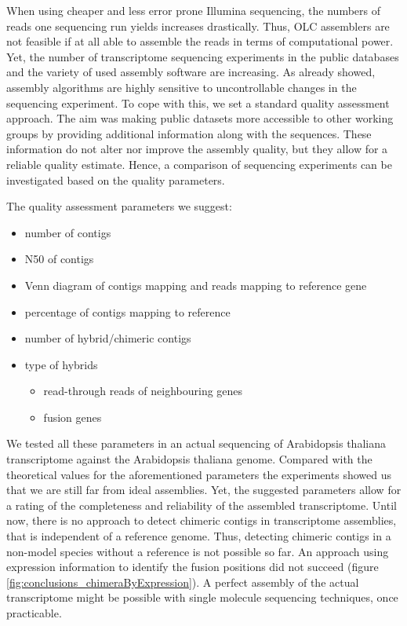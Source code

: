 	
	When using cheaper and less error prone Illumina sequencing, the numbers of reads one sequencing run yields increases drastically.
	Thus, \ac{OLC} assemblers are not feasible if at all able to assemble the reads in terms of computational power.
	Yet, the number of transcriptome sequencing experiments in the public databases and the variety of used assembly software are increasing.
	As already showed, assembly algorithms are highly sensitive to uncontrollable changes in the sequencing experiment.
	To cope with this, we set a standard quality assessment approach.
	The aim was making public datasets more accessible to other working groups by providing additional information along with the sequences.
	These information do not alter nor improve the assembly quality, but they allow for a reliable quality estimate.
	Hence, a comparison of sequencing experiments can be investigated based on the quality parameters.
	
	The quality assessment parameters we suggest:
		
		\begin{itemize}
			\item number of contigs
			\item N50 of contigs
			\item Venn diagram of contigs mapping and reads mapping to reference gene
			\item percentage of contigs mapping to reference
			\item number of hybrid/chimeric contigs
			\item type of hybrids
			\begin{itemize}
				\item read-through reads of neighbouring genes
				\item fusion genes
			\end{itemize}
		\end{itemize}
		
		We tested all these parameters in an actual sequencing of Arabidopsis thaliana transcriptome against the Arabidopsis thaliana genome.
		Compared with the theoretical values for the aforementioned parameters the experiments showed us that we are still far from ideal assemblies.
		Yet, the suggested parameters allow for a rating of the completeness and reliability of the assembled transcriptome.
		Until now, there is no approach to detect chimeric contigs in transcriptome assemblies, that is independent of a reference genome.
		Thus, detecting chimeric contigs in a non-model species without a reference is not possible so far.
		An approach using expression information to identify the fusion positions did not succeed (figure \ref{fig:conclusions_chimeraByExpression}).
		A perfect assembly of the actual transcriptome might be possible with single molecule sequencing techniques, once practicable.
		
